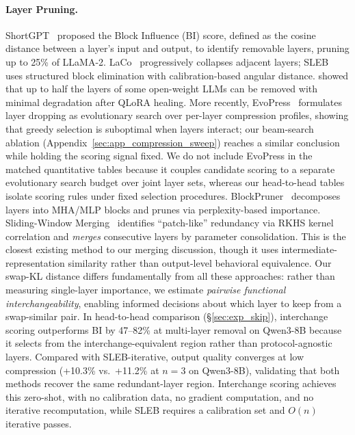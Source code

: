 \documentclass{article}
\begin{document}
\paragraph{Layer Pruning.}
ShortGPT~\citep{men2024shortgpt} proposed the Block Influence (BI) score, defined as the cosine distance between a layer's input and output, to identify removable layers, pruning up to 25\% of LLaMA-2. LaCo~\citep{yang2024laco} progressively collapses adjacent layers; SLEB~\citep{song2024sleb} uses structured block elimination with calibration-based angular distance. \citet{gromov2024unreasonable} showed that up to half the layers of some open-weight LLMs can be removed with minimal degradation after QLoRA healing. More recently, EvoPress~\citep{sieberling2025evopress} formulates layer dropping as evolutionary search over per-layer compression profiles, showing that greedy selection is suboptimal when layers interact; our beam-search ablation (Appendix~\ref{sec:app_compression_sweep}) reaches a similar conclusion while holding the scoring signal fixed. We do not include EvoPress in the matched quantitative tables because it couples candidate scoring to a separate evolutionary search budget over joint layer sets, whereas our head-to-head tables isolate scoring rules under fixed selection procedures. BlockPruner~\citep{zhong2025blockpruner} decomposes layers into MHA/MLP blocks and prunes via perplexity-based importance. Sliding-Window Merging~\citep{ding2026swm} identifies ``patch-like'' redundancy via RKHS kernel correlation and \emph{merges} consecutive layers by parameter consolidation. This is the closest existing method to our merging discussion, though it uses intermediate-representation similarity rather than output-level behavioral equivalence. Our swap-KL distance differs fundamentally from all these approaches: rather than measuring single-layer importance, we estimate \emph{pairwise functional interchangeability}, enabling informed decisions about which layer to keep from a swap-similar pair. In head-to-head comparison (\S\ref{sec:exp_skip}), interchange scoring outperforms BI by 47--82\% at multi-layer removal on Qwen3-8B because it selects from the interchange-equivalent region rather than protocol-agnostic layers. Compared with SLEB-iterative, output quality converges at low compression (+10.3\% vs.\ +11.2\% at $n{=}3$ on Qwen3-8B), validating that both methods recover the same redundant-layer region. Interchange scoring achieves this zero-shot, with no calibration data, no gradient computation, and no iterative recomputation, while SLEB requires a calibration set and $O(n)$ iterative passes.
\end{document}
